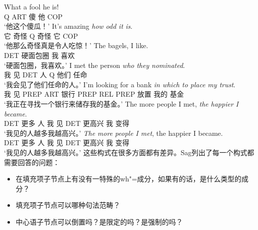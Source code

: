 \begin{exe}
\begin{xlist}[iv.]
\begin{exe}
\begin{xlist}[iv.]
\eal
\ex
\gll What a fool he is!\\
     Q ART 傻 他 COP\\
\glt `他这个傻瓜！'
\ex
\gll It's amazing \emph{how odd it is}.\\
     它 奇怪 Q 奇怪 它 COP\\
\glt `他那么奇怪真是令人吃惊！' 
\zl
\ea
\gll The bagels, I like.\\
     DET 硬面包圈 我 喜欢\\
\glt `硬面包圈，我喜欢。'
\z
\eal
\ex
\gll I met the person \emph{who they nominated}.\\
     我 见 DET 人 Q 他们 任命\\
\glt `我会见了他们任命的人。' 
\ex
\gll I'm looking for a bank \emph{in which to place my trust}.\\
     我 见 PREP ART 银行 PREP REL PREP 放置 我的 基金\\
\glt `我正在寻找一个银行来储存我的基金。' 
\zl
\eal
\ex
\gll The more people I met, \emph{the happier I became}.\\
     DET 更多 人 我 见 DET 更高兴 我 变得\\
\glt `我见的人越多我越高兴。' 
\ex 
\gll \emph{The more people I met}, the happier I became.\\
     DET 更多 人 我 见 DET 更高兴 我 变得\\
\glt `我见的人越多我越高兴。'
\zl
这些构式在很多方面都有差异。Sag列出了每一个构式都需要回答的问题：
\begin{itemize}
\item 在填充项子节点上有没有一特殊的wh"=成分，如果有的话，是什么类型的成分？
\item 填充项子节点可以哪种句法范畴？
\item 中心语子节点可以倒置吗？是限定的吗？是强制的吗？

\end{itemize}
\end{xlist}
\end{exe}
\end{xlist}
\end{exe}

